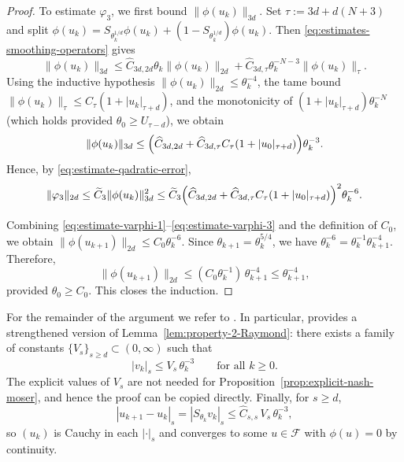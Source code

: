\documentclass[11pt]{amsart}
\begin{document}
\begin{proof}
	To estimate $\varphi_3$, we first bound $\|\phi(u_k)\|_{3d}$.
	Set $\tau:=3d+d(N+3)$ and split
	$\phi(u_k)=S_{\theta_k^{1/d}}\phi(u_k)+(1-S_{\theta_k^{1/d}})\phi(u_k)$.
	Then \eqref{eq:estimates-smoothing-operators} gives
	\[
	\|\phi(u_k)\|_{3d}
	\le \widehat C_{3d,2d}\theta_k\|\phi(u_k)\|_{2d}
	+\widehat C_{3d,\tau}\theta_k^{-N-3}\|\phi(u_k)\|_{\tau}.
	\]
	Using the inductive hypothesis $\|\phi(u_k)\|_{2d}\le \theta_k^{-4}$, the tame bound
	$\|\phi(u_k)\|_{\tau}\le C_\tau(1+|u_k|_{\tau+d})$, and the monotonicity of
	$(1+|u_k|_{\tau+d})\theta_k^{-N}$ (which holds provided $\theta_0\ge U_{\tau-d}$),
	we obtain
	\[
	\|\phi(u_k)\|_{3d}
	\le \Bigl(\widehat C_{3d,2d}+\widehat C_{3d,\tau}C_\tau(1+|u_0|_{\tau+d})\Bigr)\theta_k^{-3}.
	\]
	Hence, by \eqref{eq:estimate-qadratic-error},
	\begin{equation}\label{eq:estimate-varphi-3}
		\|\varphi_3\|_{2d}
		\le \widetilde C_3\|\phi(u_k)\|_{3d}^2
		\le \widetilde C_3\Bigl(\widehat C_{3d,2d}+\widehat C_{3d,\tau}C_\tau(1+|u_0|_{\tau+d})\Bigr)^2\theta_k^{-6}.
	\end{equation}
	
	Combining \eqref{eq:estimate-varphi-1}--\eqref{eq:estimate-varphi-3} and the definition of $C_0$,
	we obtain $\|\phi(u_{k+1})\|_{2d}\le C_0\theta_k^{-6}$.
	Since $\theta_{k+1}=\theta_k^{5/4}$, we have $\theta_k^{-6}=\theta_k^{-1}\theta_{k+1}^{-4}$. Therefore,
	\[
	\|\phi(u_{k+1})\|_{2d}\le (C_0\theta_k^{-1})\,\theta_{k+1}^{-4}\le \theta_{k+1}^{-4},
	\]
	provided $\theta_0\ge C_0$. This closes the induction.
\end{proof}

\medskip
\noindent
For the remainder of the argument we refer to \cite{Raymond1989}. In particular, \cite[Lemma~2]{Raymond1989}
provides a strengthened version of Lemma~\ref{lem:property-2-Raymond}: there exists a family of constants
$\{V_s\}_{s\ge d}\subset(0,\infty)$ such that
\[
|v_k|_s \le V_s\,\theta_k^{-3}\qquad\text{for all }k\ge 0.
\]
The explicit values of $V_s$ are not needed for Proposition~\ref{prop:explicit-nash-moser}, and hence the proof can be copied directly.
Finally, for $s\ge d$,
\[
|u_{k+1}-u_k|_s = |S_{\theta_k}v_k|_s \le \widehat C_{s,s}\,V_s\,\theta_k^{-3},
\]
so $(u_k)$ is Cauchy in each $|\cdot|_s$ and converges to some $u\in\mathcal F$ with $\phi(u)=0$ by continuity.




\end{document}
